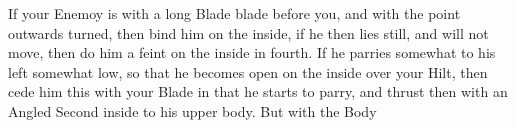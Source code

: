 
If your Enemoy is with a long Blade blade before you, and with the
point outwards turned, then bind him on the inside, if he then lies
still, and will not move, then do him a feint on the inside in
fourth. If he parries somewhat to his left somewhat low, so that he
becomes open on the inside over your Hilt, then cede him this with
your Blade in that he starts to parry, and thrust then with an Angled
Second inside to his upper body. But with the Body
